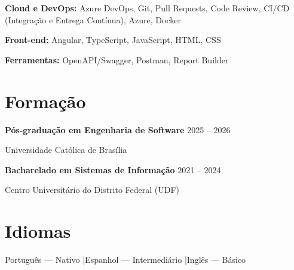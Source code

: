 \documentclass[11pt,a4paper]{article}
\begin{document}
\vspace{0.12cm}

\textbf{Cloud e DevOps:} Azure DevOps, Git, Pull Requests, Code Review, CI/CD (Integração e Entrega Contínua), Azure, Docker

\vspace{0.12cm}

\textbf{Front-end:} Angular, TypeScript, JavaScript, HTML, CSS

\vspace{0.12cm}

\textbf{Ferramentas:} OpenAPI/Swagger, Postman, Report Builder

\section{Formação}

\textbf{Pós-graduação em Engenharia de Software}
\hfill 2025 -- 2026

Universidade Católica de Brasília

\vspace{0.2cm}

\textbf{Bacharelado em Sistemas de Informação}
\hfill 2021 -- 2024

Centro Universitário do Distrito Federal (UDF)

\section{Idiomas}

Português — Nativo \quad|\quad Espanhol — Intermediário \quad|\quad Inglês — Básico
\end{document}
